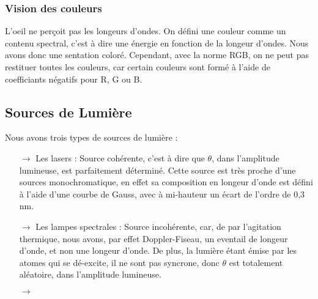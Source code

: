 \subsubsection{Vision des couleurs}
L'oeil ne perçoit pas les longeurs d'ondes. On défini une couleur comme un contenu spectral, c'est à dire une énergie en fonction de la longeur d'ondes. Nous avons donc une sentation coloré. Cependant, avec la norme RGB, on ne peut pas restituer toutes les couleurs, car certain couleurs sont formé à l'aide de coefficiants négatifs pour R, G ou B.
\subsection{Sources de Lumière}
Nous avons trois types de sources de lumière : 
\begin{itemize}
 \item[$\rightarrow$] Les lasers : Source cohérente, c'est à dire que $\theta$, dans l'amplitude lumineuse, est parfaitement déterminé. Cette source est très proche d'une sources monochromatique, en effet sa composition en longeur d'onde est défini à l'aide d'une courbe de Gauss, avec à mi-hauteur un écart de l'ordre de 0,3 nm.
 \item[$\rightarrow$] Les lampes spectrales : Source incohérente, car, de par l'agitation thermique, nous avons, par effet Doppler-Fiseau, un eventail de longeur d'onde, et non une longeur d'onde. De plus, la lumière étant émise par les atomes qui se dé-excite, il ne sont pas syncrone, donc $\theta$ est totalement aléatoire, dans l'amplitude lumineuse.
 \item[$\rightarrow$]
\end{itemize}